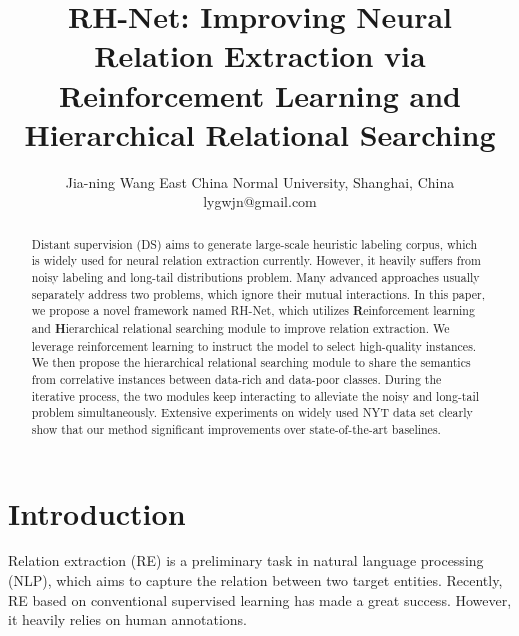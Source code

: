 \documentclass{article}
\title{RH-Net: Improving Neural Relation Extraction via Reinforcement Learning and Hierarchical Relational Searching}
\author{
Jia-ning Wang
\affiliations
East China Normal University, Shanghai, China\\
\emails
lygwjn@gmail.com
}
\begin{document}
\maketitle

\begin{abstract}
Distant supervision (DS) aims to generate large-scale heuristic labeling corpus, which is widely used for neural relation extraction currently. However, it heavily suffers from noisy labeling and long-tail distributions problem. Many advanced approaches usually separately address two problems, which ignore their mutual interactions. In this paper, we propose a novel framework named RH-Net, which utilizes \textbf{R}einforcement learning and \textbf{H}ierarchical relational searching module to improve relation extraction. We leverage reinforcement learning to instruct the model to select high-quality instances. We then propose the hierarchical relational searching module to share the semantics from correlative instances between data-rich and data-poor classes. During the iterative process, the two modules keep interacting to alleviate the noisy and long-tail problem simultaneously. Extensive experiments on widely used NYT data set clearly show that our method significant improvements over state-of-the-art baselines.
\end{abstract}

\section{Introduction}
Relation extraction (RE) is a preliminary task in natural language processing (NLP), which aims to capture the relation between two target entities. Recently, RE based on conventional supervised learning has made a great success. However, it heavily relies on human annotations. 
\end{document}
